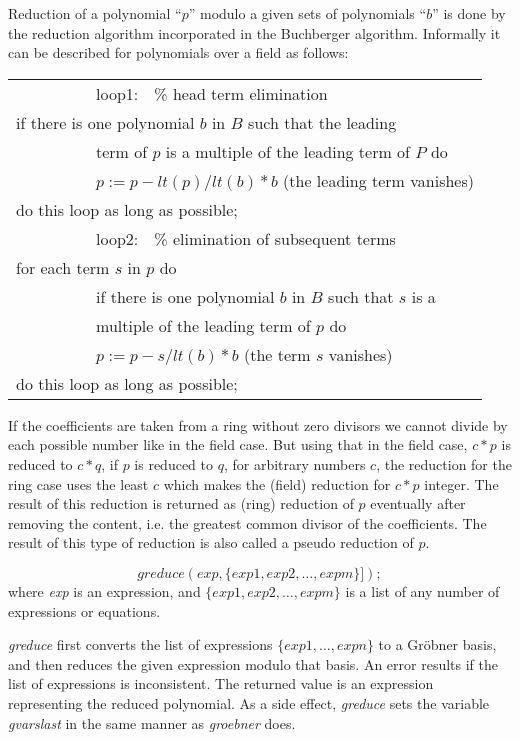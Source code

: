  \label{groebner:background}
Reduction of a polynomial ``$p$'' modulo a given sets of polynomials
``$b$'' is done by the reduction algorithm incorporated in the
Buchberger algorithm. Informally it can be described for
polynomials over a field as follows:
\begin{center}
\begin{tabular}{l}
~~~~~~~~~~loop1:~~\% head term elimination \\
if there is one polynomial $b$ in $B$ such that the leading \\
~~~~~~~~~~term of $p$ is a multiple of the leading term of $P$ do \\
~~~~~~~~~~$p := p - lt(p)/lt(b) * b$  (the leading term vanishes) \\
do this loop as long as possible; \\
~~~~~~~~~~loop2:~~\% elimination of subsequent terms \\
for each term $s$ in $p$ do \\
~~~~~~~~~~if there is one polynomial $b$ in $B$ such that $s$ is a \\
~~~~~~~~~~multiple of the leading term of $p$ do \\
~~~~~~~~~~$p := p - s/lt(b) * b$ (the term $s$ vanishes) \\
do this loop as long as possible;
\end{tabular}
\end{center}

If the coefficients are taken from a ring without zero divisors we
cannot divide by each possible number like in the field case. But
using that in the field case,  $c*p $ is reduced to  $c*q $, if $ p $
is reduced to $ q $, for arbitrary numbers $ c $,  the reduction for
the ring case uses the least $ c $ which makes the (field) reduction
for $ c*p $ integer. The result of this reduction is returned as
(ring) reduction of $ p $ eventually after removing the content, i.e.
the greatest common divisor of the coefficients. The result of this
type of reduction is also called a pseudo reduction of $ p $.

\hypertarget{operator:GREDUCE}{}
\[
\textit{greduce}(exp, \{exp1, exp2, \ldots , expm\}]);
\]
where {\it exp} is an expression, and $\{exp1, exp2,\ldots , expm\}$ is
a list of any number of expressions or equations.

\emph{greduce} first converts the list of expressions $\{exp1, \ldots ,
expn\}$ to a Gr\"obner basis, and then reduces the given expression
modulo that basis.  An error results if the list of expressions is
inconsistent. The returned value is an expression representing the
reduced polynomial. As a side effect, \emph{greduce} sets the variable {\it
gvarslast} in the same manner as \emph{groebner} does.

